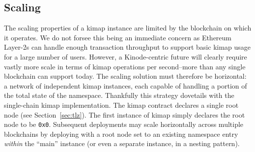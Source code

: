 \documentclass[runningheads]{llncs}
\begin{document}




\subsection{Scaling}

The scaling properties of a kimap instance are limited by the blockchain on which it operates.
We do not forsee this being an immediate concern as Ethereum Layer-2s can handle enough transaction throughput to support basic kimap usage for a large number of users.
However, a Kinode-centric future will clearly require vastly more scale in terms of kimap operations per second–more than any single blockchain can support today.
The scaling solution must therefore be horizontal: a network of independent kimap instances, each capable of handling a portion of the total state of the namespace.
Thankfully this strategy dovetails with the single-chain kimap implementation.
The kimap contract declares a single root node (see Section~\ref{sec:tlz}).
The first instance of kimap simply declares the root node to be \verb|0x0|.
Subsequent deployments may scale horizontally across multiple blockchains by deploying with a root node set to an existing namespace entry \textit{within} the ``main'' instance (or even a separate instance, in a nesting pattern).
\end{document}
